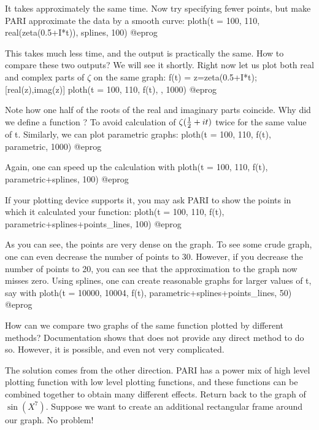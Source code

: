 It takes approximately the same time.  Now try specifying fewer points,
but make PARI approximate the data by a smooth curve:
\bprog
ploth(t = 100, 110, real(zeta(0.5+I*t)), splines, 100)
@eprog

This takes much less time, and the output is practically the same.  How to
compare these two outputs?  We will see it shortly.  Right now let us
plot both real and complex parts of $\zeta$ on the same graph:
\bprog
  f(t) = z=zeta(0.5+I*t); [real(z),imag(z)]
  ploth(t = 100, 110, f(t), , 1000)
@eprog

Note how one half of the roots of the real and imaginary parts coincide.
Why did we define a function ?  To avoid calculation of
$\zeta({1\over2} + it)$ twice for the same value of t.  Similarly, we can
plot parametric graphs:
\bprog
  ploth(t = 100, 110, f(t), parametric, 1000)
@eprog

Again, one can speed up the calculation with
\bprog
  ploth(t = 100, 110, f(t), parametric+splines, 100)
@eprog

If your plotting device supports it, you may ask PARI to show the points
in which it calculated your function:
\bprog
  ploth(t = 100, 110, f(t), parametric+splines+points_lines, 100)
@eprog

As you can see, the points are very dense on the graph.  To see some crude
graph, one can even decrease the number of points to 30.  However, if you
decrease the number of points to 20, you can see that the approximation to
the graph now misses zero.  Using splines, one can create reasonable graphs
for larger values of t, say with
\bprog
  ploth(t = 10000, 10004, f(t), parametric+splines+points_lines, 50)
@eprog

How can we compare two graphs of the same function plotted by different
methods?  Documentation shows that  does not provide any direct
method to do so.  However, it is possible, and even not very complicated.

The solution comes from the other direction.  PARI has a power mix of high
level plotting function with low level plotting functions, and these functions
can be combined together to obtain many different effects.  Return back
to the graph of $\sin(X^7)$.  Suppose we want to create an additional 
rectangular frame around our graph.  No problem!


